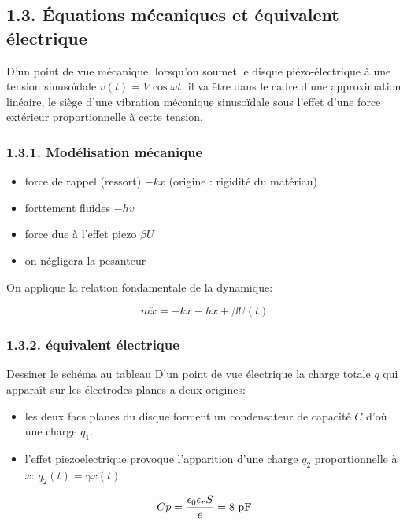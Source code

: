 \documentclass[french, a4paper, 10pt, twocolumn, landscape]{article}
\begin{document}
\subsection*{1.3. Équations mécaniques et équivalent électrique}

D'un point de vue mécanique, lorsqu'on soumet le disque piézo-électrique à une tension sinusoïdale $v(t) = V\cos{\omega t}$, il va être dans le cadre d'une approximation linéaire, le siège d'une vibration mécanique sinusoïdale sous l'effet d'une force extérieur proportionnelle à cette tension.

\subsubsection*{1.3.1. Modélisation mécanique}

\begin{itemize}
    \item force de rappel (ressort) $-kx$ (origine : rigidité du matériau)
    \item forttement fluides $-hv$
    \item force due à l'effet piezo $\beta U$
    \item on négligera la pesanteur
\end{itemize}

On applique la relation fondamentale de la dynamique: 

\begin{equation}
    m\ddot{x}=-kx-h\dot{x}+\beta U(t)
\end{equation}

\subsubsection*{1.3.2. équivalent électrique}

Dessiner le schéma au tableau
D'un point de vue électrique la charge totale $q$ qui apparaît sur les électrodes planes a deux origines: 
\begin{itemize}
    \item les deux facs planes du disque forment un condensateur de capacité $C$ d'où une charge $q_1$.
    \item l'effet piezoelectrique provoque l'apparition d'une charge $q_2$ proportionnelle à $x$: $q_2(t)=\gamma x(t)$
\end{itemize}
\begin{equation}
    Cp = \dfrac{\epsilon_0\epsilon_rS}{e} = 8~\rm pF    
\end{equation}
\end{document}
